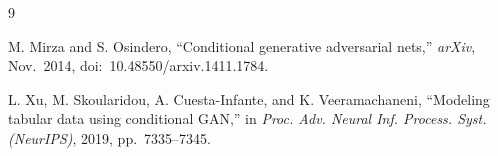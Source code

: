 \documentclass[journal,onecolumn]{IEEEtran}
\begin{document}
\FloatBarrier
\begin{thebibliography}{9}

M. Mirza and S. Osindero, ``Conditional generative adversarial nets,'' \textit{arXiv}, Nov.~2014, doi:~10.48550/arxiv.1411.1784.

L. Xu, M. Skoularidou, A. Cuesta-Infante, and K. Veeramachaneni, ``Modeling tabular data using conditional GAN,'' in \textit{Proc. Adv. Neural Inf. Process. Syst. (NeurIPS)}, 2019, pp.~7335--7345.

\end{thebibliography}
\end{document}

